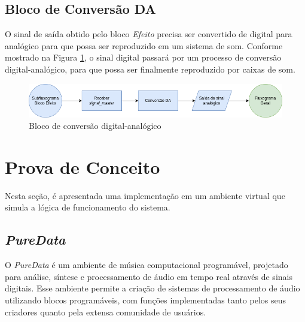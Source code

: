 \subsection{Bloco de Conversão DA}

O sinal de saída obtido pelo bloco \textit{Efeito} precisa ser convertido de digital para analógico para que possa ser reproduzido em um sistema de som.
Conforme mostrado na Figura \ref{fig59}, o sinal digital passará por um processo de conversão digital-analógico, para que possa ser finalmente reproduzido por caixas de som. 

\begin{figure}[h]
    \centering
    \includegraphics[width=\textwidth]{figuras/fig59.png}
    \caption{Bloco de conversão digital-analógico}
    \label{fig59}
\end{figure}



\section{Prova de Conceito}

Nesta seção, é apresentada uma implementação em um ambiente virtual que simula a lógica de funcionamento do sistema.

\subsection{\textit{PureData}}

O \textit{PureData} \cite{puredata} é um ambiente de música computacional programável, projetado para análise, síntese e processamento de áudio em tempo real através de sinais digitais. Esse ambiente permite a criação de sistemas de processamento de áudio utilizando blocos programáveis, com funções implementadas tanto pelos seus criadores quanto pela extensa comunidade de usuários.



